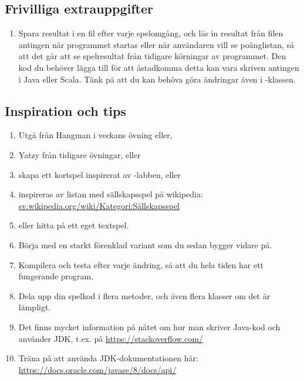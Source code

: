 \subsection{Frivilliga extrauppgifter}

\begin{enumerate}
	\item Spara resultat i en fil efter varje spelomgång, och läs in resultat från filen antingen när programmet startas eller när användaren vill se poänglistan, så att det går att se spelresultat från tidigare körningar av programmet. Den kod du behöver lägga till för att åstadkomma detta kan vara skriven antingen i Java eller Scala. Tänk på att du kan behöva göra ändringar även i -klassen.
\end{enumerate}

\subsection{Inspiration och tips}

\begin{enumerate}
  \item Utgå från Hangman i veckans övning eller,
  \item Yatzy från tidigare övningar, eller
  \item skapa ett kortspel inspirerat av -labben, eller
  \item inspireras av listan med sällskapsspel på wikipedia:\\ \href{https://sv.wikipedia.org/wiki/Kategori:Sällskapsspel}{sv.wikipedia.org/wiki/Kategori:Sällskapsspel}
  \item eller hitta på ett eget textspel.
  \item Börja med en starkt förenklad variant som du sedan bygger vidare på.
  \item Kompilera och testa efter varje ändring, så att du hela tiden har ett fungerande program.
  \item Dela upp din spelkod i flera metoder, och även flera klasser om det är lämpligt.
  \item Det finns mycket information på nätet om hur man skriver Java-kod och använder JDK, t.ex. på \url{https://stackoverflow.com/}
  \item Träna på att använda JDK-dokumentationen här:\\ \url{https://docs.oracle.com/javase/8/docs/api/}
\end{enumerate}

